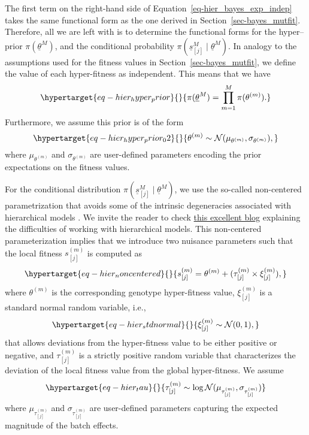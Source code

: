 \documentclass[
]{scrartcl}
\begin{document}
\begin{refsegment}
The first term on the right-hand side of
Equation~\ref{eq-hier_bayes_exp_indep} takes the same functional form as
the one derived in Section~\ref{sec-bayes_mutfit}. Therefore, all we are
left with is to determine the functional forms for the hyper--prior
\(\pi(\underline{\theta}^M)\), and the conditional probability
\(\pi(\underline{s}^M_{[j]} \mid \underline{\theta}^M)\). In analogy to
the assumptions used for the fitness values in
Section~\ref{sec-bayes_mutfit}, we define the value of each
hyper-fitness as independent. This means that we have
\begin{equation}\protect\hypertarget{eq-hier_hyper_prior}{}{
\pi(\underline{\theta}^M) = \prod_{m=1}^M \pi(\theta^{(m)}).
}\label{eq-hier_hyper_prior}\end{equation} Furthermore, we assume this
prior is of the form
\begin{equation}\protect\hypertarget{eq-hier_hyper_prior_02}{}{
\theta^{(m)} \sim \mathcal{N}(\mu_{\theta^{(m)}}, \sigma_{\theta^{(m)}}),
}\label{eq-hier_hyper_prior_02}\end{equation} where
\(\mu_{\theta^{(m)}}\) and \(\sigma_{\theta^{(m)}}\) are user-defined
parameters encoding the prior expectations on the fitness values.

For the conditional distribution
\(\pi(\underline{s}^M_{[j]} \mid \underline{\theta}^M)\), we use the
so-called non-centered parametrization that avoids some of the intrinsic
degeneracies associated with hierarchical models
\autocite{betancourt2013}. We invite the reader to check
\href{https://betanalpha.github.io/assets/case_studies/hierarchical_modeling.html}{this
excellent blog} explaining the difficulties of working with hierarchical
models. This non-centered parameterization implies that we introduce two
nuisance parameters such that the local fitness \(s_{[j]}^{(m)}\) is
computed as \begin{equation}\protect\hypertarget{eq-hier_noncentered}{}{
s_{[j]}^{(m)} = \theta^{(m)} + 
(\tau_{[j]}^{(m)} \times \xi_{[j]}^{(m)}),
}\label{eq-hier_noncentered}\end{equation} where \(\theta^{(m)}\) is the
corresponding genotype hyper-fitness value, \(\xi_{[j]}^{(m)}\) is a
standard normal random variable, i.e.,
\begin{equation}\protect\hypertarget{eq-hier_stdnormal}{}{
\xi_{[j]}^{(m)} \sim \mathcal{N}(0, 1),
}\label{eq-hier_stdnormal}\end{equation} that allows deviations from the
hyper-fitness value to be either positive or negative, and
\(\tau_{[j]}^{(m)}\) is a strictly positive random variable that
characterizes the deviation of the local fitness value from the global
hyper-fitness. We assume
\begin{equation}\protect\hypertarget{eq-hier_tau}{}{
\tau_{[j]}^{(m)} \sim \log\mathcal{N}(
    \mu_{\tau_{[j]}^{(m)}}, \sigma_{\tau_{[j]}^{(m)}}
)
}\label{eq-hier_tau}\end{equation} where \(\mu_{\tau_{[j]}^{(m)}}\) and
\(\sigma_{\tau_{[j]}^{(m)}}\) are user-defined parameters capturing the
expected magnitude of the batch effects.


\end{refsegment}
\end{document}
